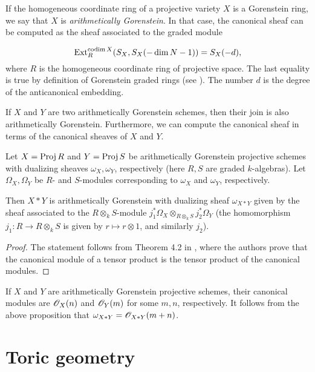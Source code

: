 If the homogeneous coordinate ring of a projective variety $X$ is a Gorenstein ring, we say that $X$ is \emph{arithmetically Gorenstein}. In that case, the canonical sheaf can be computed as the sheaf associated to the graded module

$$\operatorname{Ext}_R^{\operatorname{codim} X}(S_X,S_X(-\dim N-1))=S_X(-d),$$
where $R$ is the homogeneous coordinate ring of projective space. The last equality is true by definition of Gorenstein graded rings (see \cite[page 550]{eisenbud_commalg}). The number $d$ is the degree of the anticanonical embedding. 

If $X$ and $Y$ are two arithmetically Gorenstein schemes, then their join is also arithmetically Gorenstein. Furthermore, we can compute the canonical sheaf in terms of the canonical sheaves of $X$ and $Y$.

\begin{proposition}
Let $X=\operatorname{Proj} R$ and $Y=\operatorname{Proj} S$ be arithmetically Gorenstein projective schemes with dualizing sheaves $\omega_X, \omega_Y$, respectively (here $R, S$ are graded $k$-algebras). Let $\Omega_X, \Omega_Y$ be $R$- and $S$-modules corresponding to $\omega_X$ and $\omega_Y$, respectively.

Then $X \ast Y$ is arithmetically Gorenstein with dualizing sheaf $\omega_{X \ast Y}$ given by the sheaf associated to the $R \otimes_k S$-module $j_1^\ast \Omega_X \otimes_{R \otimes_k S} j_2^\ast \Omega_Y$ (the homomorphism $j_1:R \to R \otimes_k S$ is given by $r \mapsto r \otimes 1$, and similarly $j_2$).
\end{proposition}

\begin{proof}
The statement follows from Theorem 4.2 in \cite{herzog_canonical}, where the authors prove that the canonical module of a tensor product is the tensor product of the canonical modules.
\end{proof}

\begin{remark}
\label{remark:canonical}
If $X$ and $Y$ are arithmetically Gorenstein projective schemes, their canonical modules are $\mathscr{O}_X(n)$ and $\mathscr{O}_Y(m)$ for some $m,n$, respectively. It follows from the above proposition that $\omega_{X \ast Y} = \mathscr{O}_{X \ast Y}(m+n)$.
\end{remark}

\section{Toric geometry}
\label{sec:toric_geometry}

